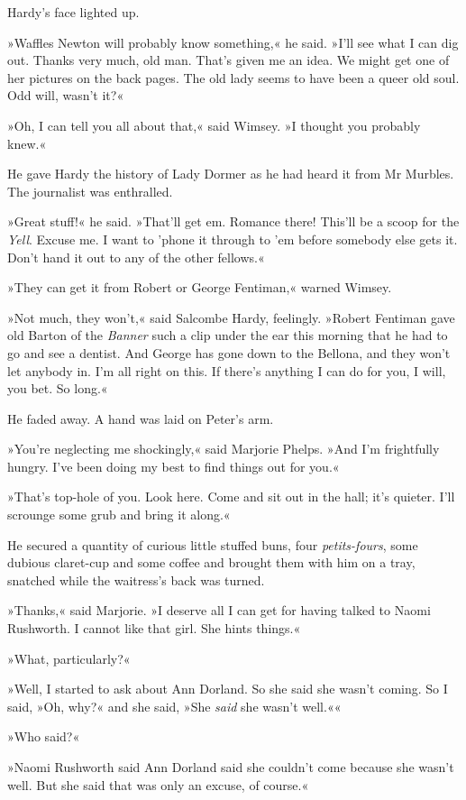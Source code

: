 Hardy's face lighted up.

»Waffles Newton will probably know something,« he said. »I'll see what I can dig out. Thanks very much, old man. That's given me an idea. We might get one of her pictures on the back pages. The old lady seems to have been a queer old soul. Odd will, wasn't it?«

»Oh, I can tell you all about that,« said Wimsey. »I thought you probably knew.«

He gave Hardy the history of Lady Dormer as he had heard it from Mr Murbles. The journalist was enthralled.

»Great stuff!« he said. »That'll get em. Romance there! This'll be a scoop for the \textit{Yell}. Excuse me. I want to 'phone it through to 'em before somebody else gets it. Don't hand it out to any of the other fellows.«

»They can get it from Robert or George Fentiman,« warned Wimsey.

»Not much, they won't,« said Salcombe Hardy, feelingly. »Robert Fentiman gave old Barton of the \textit{Banner} such a clip under the ear this morning that he had to go and see a dentist. And George has gone down to the Bellona, and they won't let anybody in. I'm all right on this. If there's anything I can do for you, I will, you bet. So long.«

He faded away. A hand was laid on Peter's arm.

»You're neglecting me shockingly,« said Marjorie Phelps. »And I'm frightfully hungry. I've been doing my best to find things out for you.«

»That's top-hole of you. Look here. Come and sit out in the hall; it's quieter. I'll scrounge some grub and bring it along.«

He secured a quantity of curious little stuffed buns, four \textit{petits-fours}, some dubious claret-cup and some coffee and brought them with him on a tray, snatched while the waitress's back was turned.

»Thanks,« said Marjorie. »I deserve all I can get for having talked to Naomi Rushworth. I cannot like that girl. She hints things.«

»What, particularly?«

»Well, I started to ask about Ann Dorland. So she said she wasn't coming. So I said, »Oh, why?« and she said, »She \textit{said} she wasn't well.««

»Who said?«

»Naomi Rushworth said Ann Dorland said she couldn't come because she wasn't well. But she said that was only an excuse, of course.«

